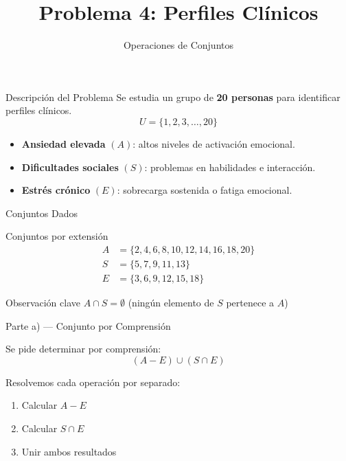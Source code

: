\documentclass[11pt]{beamer}
\title{Problema 4: Perfiles Clínicos}
\subtitle{Operaciones de Conjuntos}
\author{}
\date{}
\begin{document}
	
	\begin{frame}
		\titlepage
	\end{frame}
	
	\begin{frame}{Descripción del Problema}
		Se estudia un grupo de \textbf{20 personas} para identificar perfiles clínicos.
		\[
		U = \{1, 2, 3, \ldots, 20\}
		\]
		\begin{itemize}
			\item \textbf{Ansiedad elevada} $(A)$: altos niveles de activación emocional.
			\item \textbf{Dificultades sociales} $(S)$: problemas en habilidades e interacción.
			\item \textbf{Estrés crónico} $(E)$: sobrecarga sostenida o fatiga emocional.
		\end{itemize}
	\end{frame}
	
	\begin{frame}{Conjuntos Dados}
		\begin{block}{Conjuntos por extensión}
			\begin{align*}
				A &= \{2, 4, 6, 8, 10, 12, 14, 16, 18, 20\} \\[6pt]
				S &= \{5, 7, 9, 11, 13\} \\[6pt]
				E &= \{3, 6, 9, 12, 15, 18\}
			\end{align*}
		\end{block}
		\begin{alertblock}{Observación clave}
			$A \cap S = \emptyset$ \quad (ningún elemento de $S$ pertenece a $A$)
		\end{alertblock}
	\end{frame}
	
	\begin{frame}{Parte a) — Conjunto por Comprensión}
		\begin{block}{Se pide determinar por comprensión:}
			\[
			(A - E) \cup (S \cap E)
			\]
		\end{block}
		\bigskip
		Resolvemos cada operación por separado:
		\begin{enumerate}
			\item Calcular $A - E$
			\item Calcular $S \cap E$
			\item Unir ambos resultados
		\end{enumerate}
	\end{frame}
	
\end{document}
